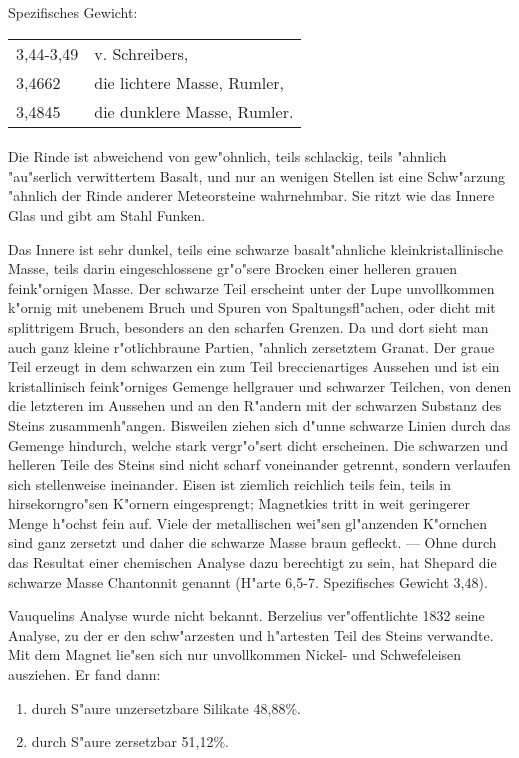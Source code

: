 \documentclass[a4paper, 11pt, oneside]{article}
\begin{document}
Spezifisches Gewicht:
\begin{table}[!ht]
    \centering
    \begin{tabular}{l l}
        3,44-3,49 & v. Schreibers,\\
        3,4662 & die lichtere Masse, Rumler,\\
        3,4845 & die dunklere Masse, Rumler.
    \end{tabular}
\end{table}
\paragraph{}
Die Rinde ist abweichend von gew"ohnlich, teils schlackig, teils "ahnlich "au"serlich verwittertem Basalt, und nur an wenigen Stellen ist eine Schw"arzung "ahnlich der Rinde anderer Meteorsteine wahrnehmbar. Sie ritzt wie das Innere Glas und gibt am Stahl Funken.

Das Innere ist sehr dunkel, teils eine schwarze basalt"ahnliche kleinkristallinische Masse, teils darin eingeschlossene gr"o"sere Brocken einer helleren grauen feink"ornigen Masse. Der schwarze Teil erscheint unter der Lupe unvollkommen k"ornig mit unebenem Bruch und Spuren von Spaltungsfl"achen, oder dicht mit splittrigem Bruch, besonders an den scharfen Grenzen. Da und dort sieht man auch ganz kleine r"otlichbraune Partien, "ahnlich zersetztem Granat. Der graue Teil erzeugt in dem schwarzen ein zum Teil breccienartiges Aussehen und ist ein kristallinisch feink"orniges Gemenge hellgrauer und schwarzer Teilchen, von denen die letzteren im Aussehen und an den R"andern mit der schwarzen Substanz des Steins zusammenh"angen. Bisweilen ziehen sich d"unne schwarze Linien durch das Gemenge hindurch, welche stark vergr"o"sert dicht erscheinen. Die schwarzen und helleren Teile des Steins sind nicht scharf voneinander getrennt, sondern verlaufen sich stellenweise ineinander. Eisen ist ziemlich reichlich teils fein, teils in hirsekorngro"sen K"ornern eingesprengt; Magnetkies tritt in weit geringerer Menge h"ochst fein auf. Viele der metallischen wei"sen gl"anzenden K"ornchen sind ganz zersetzt und daher die schwarze Masse braun gefleckt. --- Ohne durch das Resultat einer chemischen Analyse dazu berechtigt zu sein, hat Shepard die schwarze Masse Chantonnit genannt (H"arte 6,5-7. Spezifisches Gewicht 3,48).

Vauquelins Analyse wurde nicht bekannt. Berzelius ver"offentlichte 1832 seine Analyse, zu der er den schw"arzesten und h"artesten Teil des Steins verwandte. Mit dem Magnet lie"sen sich nur unvollkommen Nickel- und Schwefeleisen ausziehen. Er fand dann:
\begin{enumerate}
    \item durch S"aure unzersetzbare Silikate 48,88\%.
    \item durch S"aure zersetzbar 51,12\%.
\end{enumerate}
\end{document}
